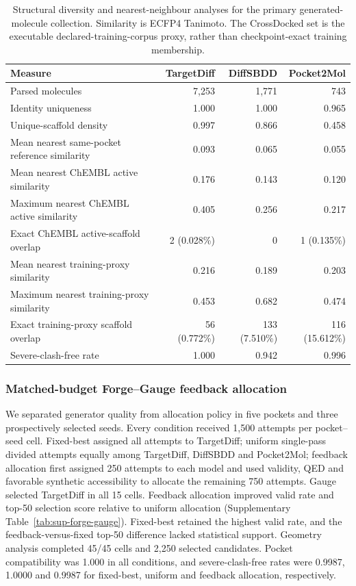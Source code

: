 \documentclass{article}
\begin{document}
\begin{table}[htbp]
\centering
\small
\caption{Structural diversity and nearest-neighbour analyses for the primary generated-molecule collection. Similarity is ECFP4 Tanimoto. The CrossDocked set is the executable declared-training-corpus proxy, rather than checkpoint-exact training membership.}
\label{tab:sup-generation-novelty}
\begin{tabular}{lrrr}
\toprule
Measure & TargetDiff & DiffSBDD & Pocket2Mol \\
\midrule
Parsed molecules & 7,253 & 1,771 & 743 \\
Identity uniqueness & 1.000 & 1.000 & 0.965 \\
Unique-scaffold density & 0.997 & 0.866 & 0.458 \\
Mean nearest same-pocket reference similarity & 0.093 & 0.065 & 0.055 \\
Mean nearest ChEMBL active similarity & 0.176 & 0.143 & 0.120 \\
Maximum nearest ChEMBL active similarity & 0.405 & 0.256 & 0.217 \\
Exact ChEMBL active-scaffold overlap & 2 (0.028\%) & 0 & 1 (0.135\%) \\
Mean nearest training-proxy similarity & 0.216 & 0.189 & 0.203 \\
Maximum nearest training-proxy similarity & 0.453 & 0.682 & 0.474 \\
Exact training-proxy scaffold overlap & 56 (0.772\%) & 133 (7.510\%) & 116 (15.612\%) \\
Severe-clash-free rate & 1.000 & 0.942 & 0.996 \\
\bottomrule
\end{tabular}
\end{table}

\subsubsection{Matched-budget Forge--Gauge feedback allocation}

We separated generator quality from allocation policy in five pockets and three prospectively selected seeds. Every condition received 1,500 attempts per pocket--seed cell. Fixed-best assigned all attempts to TargetDiff; uniform single-pass divided attempts equally among TargetDiff, DiffSBDD and Pocket2Mol; feedback allocation first assigned 250 attempts to each model and used validity, QED and favorable synthetic accessibility to allocate the remaining 750 attempts. Gauge selected TargetDiff in all 15 cells. Feedback allocation improved valid rate and top-50 selection score relative to uniform allocation (Supplementary Table~\ref{tab:sup-forge-gauge}). Fixed-best retained the highest valid rate, and the feedback-versus-fixed top-50 difference lacked statistical support. Geometry analysis completed 45/45 cells and 2,250 selected candidates. Pocket compatibility was 1.000 in all conditions, and severe-clash-free rates were 0.9987, 1.0000 and 0.9987 for fixed-best, uniform and feedback allocation, respectively.
\end{document}
